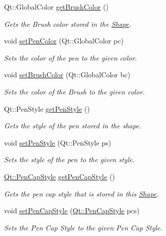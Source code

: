 \begin{DoxyCompactItemize}
Qt\+::\+Global\+Color \hyperlink{classCircle_a82bde4b53ba1026e640db30b1096d60b}{get\+Brush\+Color} ()
\begin{DoxyCompactList}\small\item\em Gets the Brush color stored in the \hyperlink{classShape}{Shape}. \end{DoxyCompactList}\item 
void \hyperlink{classCircle_ad7ea24061f3ac147c396ca258b132018}{set\+Pen\+Color} (Qt\+::\+Global\+Color pc)
\begin{DoxyCompactList}\small\item\em Sets the color of the pen to the given color. \end{DoxyCompactList}\item 
void \hyperlink{classCircle_adc5d39dd16a7f02a4142903d17b02744}{set\+Brush\+Color} (Qt\+::\+Global\+Color bc)
\begin{DoxyCompactList}\small\item\em Sets the color of the Brush to the given color. \end{DoxyCompactList}\item 
Qt\+::\+Pen\+Style \hyperlink{classCircle_aca52e370c08797fd90af17499bc33e5b}{get\+Pen\+Style} ()
\begin{DoxyCompactList}\small\item\em Gets the style of the pen stored in the shape. \end{DoxyCompactList}\item 
void \hyperlink{classCircle_a0eb4403f9655b48e774e2be89dd18088}{set\+Pen\+Style} (Qt\+::\+Pen\+Style ps)
\begin{DoxyCompactList}\small\item\em Sets the style of the pen to the given style. \end{DoxyCompactList}\item 
\hyperlink{shape__input__file__specs_8txt_a622efdcfef6789d4367974d2fe79019e}{Qt\+::\+Pen\+Cap\+Style} \hyperlink{classCircle_abaf3d67a11b83ba5df3ce7a8a382bbc1}{get\+Pen\+Cap\+Style} ()
\begin{DoxyCompactList}\small\item\em Gets the pen cap style that is stored in this \hyperlink{classShape}{Shape}. \end{DoxyCompactList}\item 
void \hyperlink{classCircle_ad93fa94177ed8bfbb9c695b6bab9d8b3}{set\+Pen\+Cap\+Style} (\hyperlink{shape__input__file__specs_8txt_a622efdcfef6789d4367974d2fe79019e}{Qt\+::\+Pen\+Cap\+Style} pcs)
\begin{DoxyCompactList}\small\item\em Sets the Pen Cap Style to the given Pen Cap Style. \end{DoxyCompactList}\item 

\end{DoxyCompactItemize}
